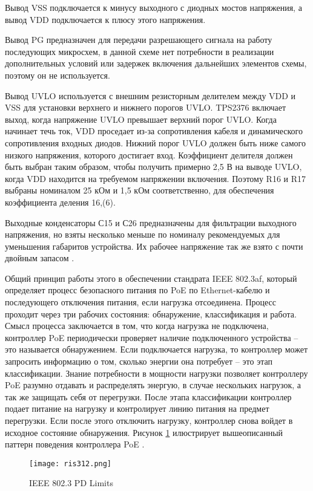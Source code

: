 Вывод VSS подключается к минусу выходного с диодных мостов напряжения, 
а вывод VDD подключается к плюсу этого напряжения.

Вывод PG предназначен для передачи разрешающего сигнала на работу последующих микросхем,
в данной схеме нет потребности в реализации дополнительных условий или задержек включения
дальнейших элементов схемы, поэтому он не используется.

Вывод UVLO используется с внешним резисторным делителем между VDD и VSS для установки 
верхнего и нижнего порогов UVLO. TPS2376 включает выход, когда напряжение UVLO превышает верхний 
порог UVLO. Когда начинает течь ток, VDD проседает из-за сопротивления кабеля и динамического 
сопротивления входных диодов. Нижний порог UVLO должен быть ниже самого низкого напряжения, 
которого достигает вход. Коэффициент делителя должен быть выбран таким образом, 
чтобы получить примерно 2,5 В на выводе UVLO, когда VDD находится на требуемом 
напряжении включения. Поэтому R16 и R17 выбраны номиналом 25 кОм и 1,5 кОм соответственно,
для обеспечения коэффициента деления 16,(6).

Выходные конденсаторы С15 и С26 предназначены для фильтрации выходного напряжения, но взяты 
несколько меньше по номиналу рекомендуемых для уменьшения габаритов устройства. Их рабочее
напряжение так же взято с почти двойным запасом \cite{TPS2376:datasheet}.

Общий принцип работы этого в обеспечении стандрата IEEE 802.3af, который определяет 
процесс безопасного питания по PoE по Ethernet-кабелю и последующего отключения питания, 
если нагрузка отсоединена. Процесс проходит через три рабочих состояния: обнаружение, 
классификация и работа. Смысл процесса заключается в том, что когда нагрузка не подключена,
контроллер PoE периодически проверяет наличие подключенного устройства -- это называется 
обнаружением. Если подключается нагрузка, то контроллер может запросить информацию о том,
сколько энергии она потребует -- это этап классификации. Знание потребности в мощности нагрузки 
позволяет контроллеру PoE разумно отдавать и распределять энергую, в случае нескольких нагрузок,
а так же защищать себя от перегрузки. После этапа классификации контроллер подает питание на 
нагрузку и контролирует линию питания на предмет перегрузки. Если после этого отключить нагрузку,
контроллер снова войдет в исходное состояние обнаружения. Рисунок \ref{ris:312}  илюстрирует 
вышеописанный паттерн поведения контроллера PoE \cite{TPS2376:datasheet}.

\begin{figure}[H]
    \centering
    \texttt{[image: ris312.png]}
    \caption{IEEE 802.3 PD Limits}
    \label{ris:312}
\end{figure}

